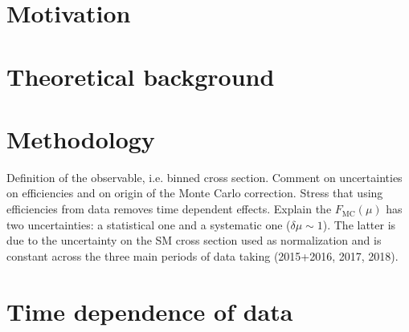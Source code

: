 \documentclass[NOTE, atlasdraft=true, texlive=2016, UKenglish]{atlasdoc}
\newcommand{\el}[1]{{\color{orange} #1}}
\begin{document}
\maketitle

\tableofcontents



\clearpage

\clearpage
\section{Motivation}
\label{lab:Motivation}


\clearpage
\section{Theoretical background} %
\label{lab:Theory}


\clearpage
\section{Methodology} %
\label{lab:Methodology}
\el{Definition of the observable, i.e. binned cross section. Comment on uncertainties on efficiencies and on origin of the Monte Carlo correction. Stress that using efficiencies from data removes time dependent effects. Explain the $F_\text{MC}(\mu)$ has two uncertainties: a statistical one and a systematic one ($\delta \mu \sim 1$). The latter is due to the uncertainty on the SM cross section used as normalization and is constant across the three main periods of data taking (2015+2016, 2017, 2018).}
%

\clearpage
\section{Time dependence of data}  
\label{sec:data_time_dependence}

%
\end{document}

